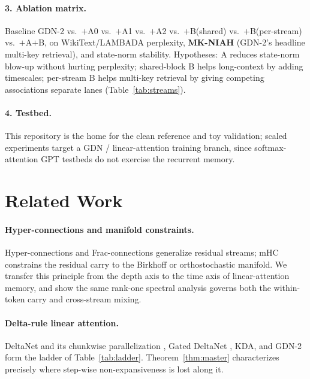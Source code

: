\documentclass[11pt,letterpaper,logo]{yalearxiv}
\begin{document}
\paragraph{3. Ablation matrix.} Baseline GDN-2 vs.\ $+$A0 vs.\ $+$A1 vs.\ $+$A2 vs.\
$+$B(shared) vs.\ $+$B(per-stream) vs.\ $+$A$+$B, on WikiText/LAMBADA perplexity,
\textbf{MK-NIAH} (GDN-2's headline multi-key retrieval), and state-norm stability.
Hypotheses: A reduces state-norm blow-up without hurting perplexity; shared-block B helps
long-context by adding timescales; per-stream B helps multi-key retrieval by giving
competing associations separate lanes (Table~\ref{tab:streams}).

\paragraph{4. Testbed.} This repository is the home for the clean reference and toy
validation; scaled experiments target a GDN / linear-attention training branch, since
softmax-attention GPT testbeds do not exercise the recurrent memory.


\section{Related Work}
\label{sec:related}

\paragraph{Hyper-connections and manifold constraints.} Hyper-connections
\citep{zhu2024hyperconnections} and Frac-connections \citep{zhu2025fracconnections}
generalize residual streams; mHC \citep{deepseek2025mhc} constrains the residual carry to
the Birkhoff or orthostochastic manifold. We transfer this principle from the depth axis to
the time axis of linear-attention memory, and show the same rank-one spectral analysis
governs both the within-token carry and cross-stream mixing.

\paragraph{Delta-rule linear attention.} DeltaNet \citep{schlag2021linear} and its chunkwise
parallelization \citep{yang2024parallelizing}, Gated DeltaNet \citep{yang2024gdn}, KDA, and
GDN-2 \citep{hatamizadeh2026gdn2} form the ladder of Table~\ref{tab:ladder}.
Theorem~\ref{thm:master} characterizes precisely where step-wise non-expansiveness is lost
along it.
\end{document}
